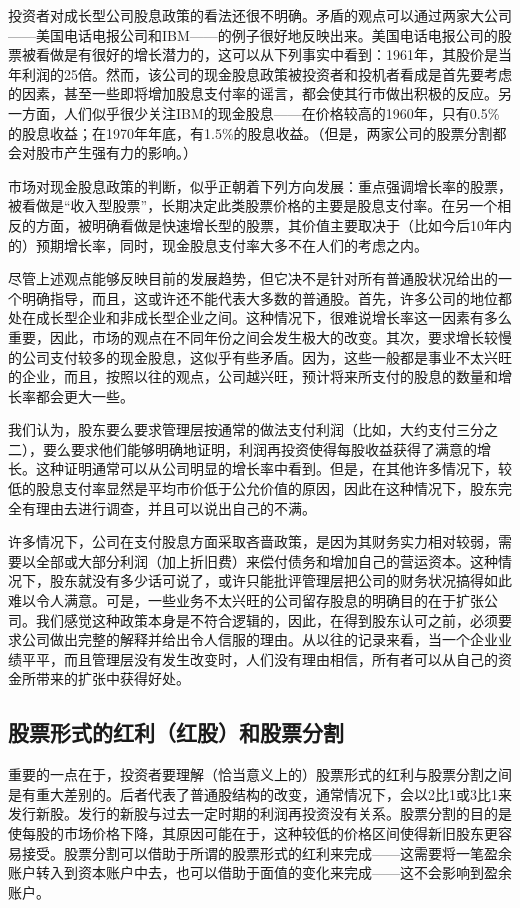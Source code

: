 \documentclass[12pt,oneside]{book}
\begin{document}
投资者对成长型公司股息政策的看法还很不明确。矛盾的观点可以通过两家大公司——美国电话电报公司和IBM——的例子很好地反映出来。美国电话电报公司的股票被看做是有很好的增长潜力的，这可以从下列事实中看到：1961年，其股价是当年利润的25倍。然而，该公司的现金股息政策被投资者和投机者看成是首先要考虑的因素，甚至一些即将增加股息支付率的谣言，都会使其行市做出积极的反应。另一方面，人们似乎很少关注IBM的现金股息——在价格较高的1960年，只有0.5\%的股息收益；在1970年年底，有1.5\%的股息收益。（但是，两家公司的股票分割都会对股市产生强有力的影响。）

市场对现金股息政策的判断，似乎正朝着下列方向发展：重点强调增长率的股票，被看做是“收入型股票”，长期决定此类股票价格的主要是股息支付率。在另一个相反的方面，被明确看做是快速增长型的股票，其价值主要取决于（比如今后10年内的）预期增长率，同时，现金股息支付率大多不在人们的考虑之内。

尽管上述观点能够反映目前的发展趋势，但它决不是针对所有普通股状况给出的一个明确指导，而且，这或许还不能代表大多数的普通股。首先，许多公司的地位都处在成长型企业和非成长型企业之间。这种情况下，很难说增长率这一因素有多么重要，因此，市场的观点在不同年份之间会发生极大的改变。其次，要求增长较慢的公司支付较多的现金股息，这似乎有些矛盾。因为，这些一般都是事业不太兴旺的企业，而且，按照以往的观点，公司越兴旺，预计将来所支付的股息的数量和增长率都会更大一些。


我们认为，股东要么要求管理层按通常的做法支付利润（比如，大约支付三分之二），要么要求他们能够明确地证明，利润再投资使得每股收益获得了满意的增长。这种证明通常可以从公司明显的增长率中看到。但是，在其他许多情况下，较低的股息支付率显然是平均市价低于公允价值的原因，因此在这种情况下，股东完全有理由去进行调查，并且可以说出自己的不满。

许多情况下，公司在支付股息方面采取吝啬政策，是因为其财务实力相对较弱，需要以全部或大部分利润（加上折旧费）来偿付债务和增加自己的营运资本。这种情况下，股东就没有多少话可说了，或许只能批评管理层把公司的财务状况搞得如此难以令人满意。可是，一些业务不太兴旺的公司留存股息的明确目的在于扩张公司。我们感觉这种政策本身是不符合逻辑的，因此，在得到股东认可之前，必须要求公司做出完整的解释并给出令人信服的理由。从以往的记录来看，当一个企业业绩平平，而且管理层没有发生改变时，人们没有理由相信，所有者可以从自己的资金所带来的扩张中获得好处。

\subsection{股票形式的红利（红股）和股票分割}
重要的一点在于，投资者要理解（恰当意义上的）股票形式的红利与股票分割之间是有重大差别的。后者代表了普通股结构的改变，通常情况下，会以2比1或3比1来发行新股。发行的新股与过去一定时期的利润再投资没有关系。股票分割的目的是使每股的市场价格下降，其原因可能在于，这种较低的价格区间使得新旧股东更容易接受。股票分割可以借助于所谓的股票形式的红利来完成——这需要将一笔盈余账户转入到资本账户中去，也可以借助于面值的变化来完成——这不会影响到盈余账户。
\end{document}
